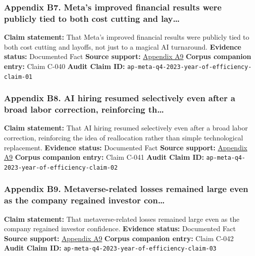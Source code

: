 \documentclass[
  american,
  11pt,
  letterpaper,
]{article}
\begin{document}
\subsubsection{Appendix B7. Meta's improved financial results were
publicly tied to both cost cutting and
lay\ldots{}}\label{ch-05-appendix-b7-meta-s-improved-financial-results-were-publicly-tied-to-both-cost-cutting-and-lay}

\textbf{Claim statement:} That Meta's improved financial results were
publicly tied to both cost cutting and layoffs, not just to a magical AI
turnaround. \textbf{Evidence status:} Documented Fact \textbf{Source
support:}
\hyperref[ch-05-appendix-a9-meta-posts-sharp-profit-revenue-increase-in-q4-thanks-to-cost-cuts-and-advertising-rebound]{Appendix
A9} \textbf{Corpus companion entry:} Claim C-040 \textbf{Audit Claim
ID:} \texttt{ap-meta-q4-2023-year-of-efficiency-claim-01}

\subsubsection{Appendix B8. AI hiring resumed selectively even after a
broad labor correction, reinforcing
th\ldots{}}\label{ch-05-appendix-b8-ai-hiring-resumed-selectively-even-after-a-broad-labor-correction-reinforcing-th}

\textbf{Claim statement:} That AI hiring resumed selectively even after
a broad labor correction, reinforcing the idea of reallocation rather
than simple technological replacement. \textbf{Evidence status:}
Documented Fact \textbf{Source support:}
\hyperref[ch-05-appendix-a9-meta-posts-sharp-profit-revenue-increase-in-q4-thanks-to-cost-cuts-and-advertising-rebound]{Appendix
A9} \textbf{Corpus companion entry:} Claim C-041 \textbf{Audit Claim
ID:} \texttt{ap-meta-q4-2023-year-of-efficiency-claim-02}

\subsubsection{Appendix B9. Metaverse-related losses remained large even
as the company regained investor
con\ldots{}}\label{ch-05-appendix-b9-metaverse-related-losses-remained-large-even-as-the-company-regained-investor-con}

\textbf{Claim statement:} That metaverse-related losses remained large
even as the company regained investor confidence. \textbf{Evidence
status:} Documented Fact \textbf{Source support:}
\hyperref[ch-05-appendix-a9-meta-posts-sharp-profit-revenue-increase-in-q4-thanks-to-cost-cuts-and-advertising-rebound]{Appendix
A9} \textbf{Corpus companion entry:} Claim C-042 \textbf{Audit Claim
ID:} \texttt{ap-meta-q4-2023-year-of-efficiency-claim-03}
\end{document}

